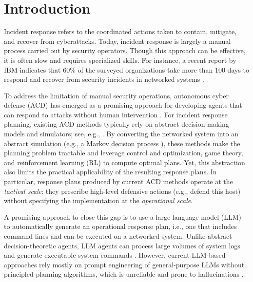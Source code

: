 \documentclass[runningheads,10pt]{llncs}
\begin{document}
\section{Introduction}
Incident response refers to the coordinated actions taken to contain, mitigate, and recover from cyberattacks. Today, incident response is largely a manual process carried out by security operators. Though this approach can be effective, it is often slow and requires specialized skills. For instance, a recent report by IBM indicates that 60\% of the surveyed organizations take more than 100 days to respond and recover from security incidents in networked systems \cite{ibm-report}.

To address the limitation of manual security operations, autonomous cyber defense (ACD) has emerged as a promising approach for developing agents that can respond to attacks without human intervention \cite{burnap25acd-survey,reddi23rl4sec,li2025agentic}. For incident response planning, existing ACD methods typically rely on abstract decision-making models and simulators; see, e.g., \cite{zhu13gamesec}. By converting the networked system into an abstract simulation (e.g., a Markov decision process \cite{erik18pomdp-defense,tao25deception,xinqi26deplay-rl}), these methods make the planning problem tractable and leverage control and optimization, game theory, and reinforcement learning (RL) to compute optimal plans. Yet, this abstraction also limits the practical applicability of the resulting response plans. In particular, response plans produced by current ACD methods operate at the \textit{tactical scale}: they prescribe high-level defensive actions (e.g., defend this host) without specifying the implementation at the \textit{operational scale}.

A promising approach to close this gap is to use a large language model (LLM) to automatically generate an operational response plan, i.e., one that includes command lines and can be executed on a networked system. Unlike abstract decision-theoretic agents, LLM agents can process large volumes of system logs and generate executable system commands \cite{llm4sec-review25}. However, current LLM-based approaches rely mostly on prompt engineering of general-purpose LLMs without principled planning algorithms, which is unreliable and prone to hallucinations \cite{hamoun25llm-acd,cardenas25llm4acd,guo25ircopilot}.
\end{document}
